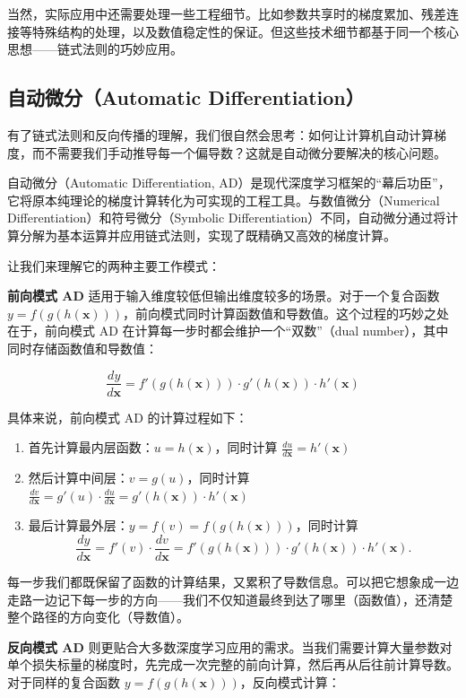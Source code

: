 当然，实际应用中还需要处理一些工程细节。比如参数共享时的梯度累加、残差连接等特殊结构的处理，以及数值稳定性的保证。但这些技术细节都基于同一个核心思想——链式法则的巧妙应用。

\subsection{自动微分（Automatic Differentiation）}

有了链式法则和反向传播的理解，我们很自然会思考：如何让计算机自动计算梯度，而不需要我们手动推导每一个偏导数？这就是自动微分要解决的核心问题。

自动微分（Automatic Differentiation, AD）是现代深度学习框架的``幕后功臣''，它将原本纯理论的梯度计算转化为可实现的工程工具。与数值微分（Numerical Differentiation）和符号微分（Symbolic Differentiation）不同，自动微分通过将计算分解为基本运算并应用链式法则，实现了既精确又高效的梯度计算。

让我们来理解它的两种主要工作模式：

\textbf{前向模式 AD} 适用于输入维度较低但输出维度较多的场景。对于一个复合函数 $y = f(g(h(\mathbf{x})))$，前向模式同时计算函数值和导数值。这个过程的巧妙之处在于，前向模式 AD 在计算每一步时都会维护一个``双数''（dual number），其中同时存储函数值和导数值：

$$\frac{dy}{d\mathbf{x}} = f'(g(h(\mathbf{x}))) \cdot g'(h(\mathbf{x})) \cdot h'(\mathbf{x})$$

具体来说，前向模式 AD 的计算过程如下：
\begin{enumerate}
\item 首先计算最内层函数：$u = h(\mathbf{x})$，同时计算 $\frac{du}{d\mathbf{x}} = h'(\mathbf{x})$
\item 然后计算中间层：$v = g(u)$，同时计算 $\frac{dv}{d\mathbf{x}} = g'(u) \cdot \frac{du}{d\mathbf{x}} = g'(h(\mathbf{x})) \cdot h'(\mathbf{x})$
\item 最后计算最外层：$y = f(v) = f(g(h(\mathbf{x})))$，同时计算
$$\frac{dy}{d\mathbf{x}} = f'(v) \cdot \frac{dv}{d\mathbf{x}} = f'(g(h(\mathbf{x}))) \cdot g'(h(\mathbf{x})) \cdot h'(\mathbf{x}).$$
\end{enumerate}

每一步我们都既保留了函数的计算结果，又累积了导数信息。可以把它想象成一边走路一边记下每一步的方向——我们不仅知道最终到达了哪里（函数值），还清楚整个路径的方向变化（导数值）。

\textbf{反向模式 AD} 则更贴合大多数深度学习应用的需求。当我们需要计算大量参数对单个损失标量的梯度时，先完成一次完整的前向计算，然后再从后往前计算导数。对于同样的复合函数 $y = f(g(h(\mathbf{x})))$，反向模式计算：

